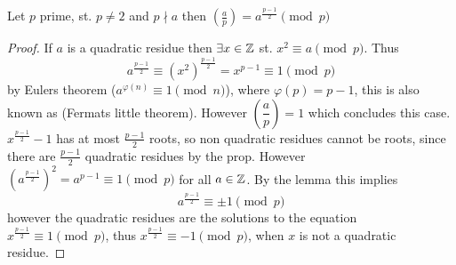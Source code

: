 \begin{theorem}
  Let $p$ prime, st. $p \neq 2$ and $p \nmid a$ then $\left(\frac{a}{p}\right) = a^{\frac{p - 1}{2}} \pmod{p}$
\end{theorem}
\begin{proof}
  If $a$ is a quadratic residue then $\exists x \in \mathbb{Z}$ st. $x^{2} \equiv a \pmod{p}$. Thus
  \begin{equation*}
    a^{\frac{p - 1}{2}} \equiv (x^{2})^{\frac{p - 1}{2}} = x^{p - 1} \equiv 1 \pmod{p}
  \end{equation*}
  by Eulers theorem ($a^{\varphi(n)} \equiv 1 \pmod{n}$), where $\varphi(p) = p - 1$, this is also known as (Fermats little theorem).
  However $\left(\dfrac{a}{p}\right) = 1$ which concludes this case.
  $x^{\frac{p - 1}{2}} - 1$ has at most $\frac{p - 1}{2}$ roots, so non quadratic residues cannot be roots, since there are $\frac{p - 1}{2}$ quadratic residues by the prop. However $\left(a^{\frac{p - 1}{2}}\right)^{2} = a^{p - 1} \equiv 1 \pmod{p}$ for all $a \in \mathbb{Z}$. By the lemma this implies
  \begin{equation*}
    a^{\frac{p - 1}{2}} \equiv \pm 1 \pmod{p}
  \end{equation*}
  however the quadratic residues are the solutions to the equation $x^{\frac{p - 1}{2}} \equiv 1 \pmod{p}$, thus $x^{\frac{p - 1}{2}} \equiv -1 \pmod{p}$, when $x$ is not a quadratic residue.
\end{proof}
